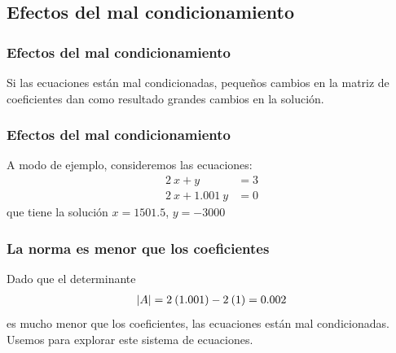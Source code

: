 \subsection*{Efectos del mal condicionamiento}
\begin{frame}
\frametitle{Efectos del mal condicionamiento}
Si las ecuaciones están mal condicionadas, pequeños cambios en la matriz de coeficientes dan como resultado grandes cambios en la solución.
\end{frame}
\begin{frame}
\frametitle{Efectos del mal condicionamiento}
A modo de ejemplo, consideremos las ecuaciones:
\begin{align*}
2 \: x + y &= 3 \\
2 \: x + 1.001 \:y &= 0
\end{align*}
que tiene la solución $x = 1501.5$, $y = -3000$
\end{frame}
\begin{frame}[fragile]
\frametitle{La norma es menor que los coeficientes}
Dado que el determinante 
\begin{align*}
\abs{A} = 2 \: (1.001) - 2 \: (1) = 0.002 
\end{align*}
 es mucho menor que los coeficientes, las ecuaciones están mal condicionadas.
\\
\bigskip
\pause
Usemos \python{} para explorar este sistema de ecuaciones.
\end{frame}
